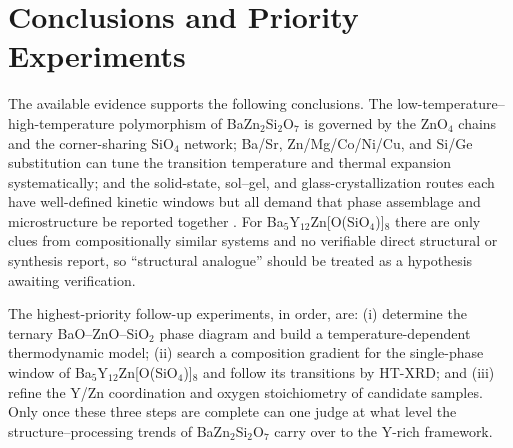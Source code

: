 \section{Conclusions and Priority Experiments}

The available evidence supports the following conclusions. The low-temperature--high-temperature polymorphism of BaZn$_2$Si$_2$O$_7$ is governed by the ZnO$_4$ chains and the corner-sharing SiO$_4$ network; Ba\slash Sr, Zn\slash Mg\slash Co\slash Ni\slash Cu, and Si\slash Ge substitution can tune the transition temperature and thermal expansion systematically; and the solid-state, sol--gel, and glass-crystallization routes each have well-defined kinetic windows but all demand that phase assemblage and microstructure be reported together \cite{lin1999phase,kerstan2012thermal,thieme2015ba1,thieme2016new,bocker2012in}. For Ba$_5$Y$_{12}$Zn[O(SiO$_4$)]$_8$ there are only clues from compositionally similar systems and no verifiable direct structural or synthesis report, so ``structural analogue'' should be treated as a hypothesis awaiting verification.

The highest-priority follow-up experiments, in order, are: (i) determine the ternary BaO--ZnO--SiO$_2$ phase diagram and build a temperature-dependent thermodynamic model; (ii) search a composition gradient for the single-phase window of Ba$_5$Y$_{12}$Zn[O(SiO$_4$)]$_8$ and follow its transitions by HT\nobreakdash-XRD; and (iii) refine the Y\slash Zn coordination and oxygen stoichiometry of candidate samples. Only once these three steps are complete can one judge at what level the structure--processing trends of BaZn$_2$Si$_2$O$_7$ carry over to the Y-rich framework.
